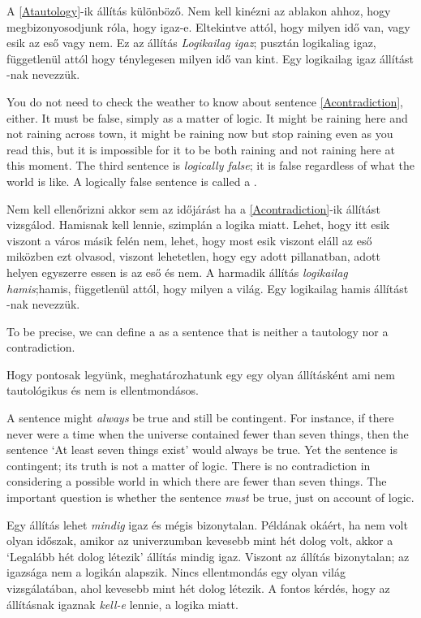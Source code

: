 A \ref{Atautology}-ik állítás különböző. Nem kell kinézni az ablakon ahhoz, hogy megbizonyosodjunk róla, hogy igaz-e. Eltekintve attól, hogy milyen idő van, vagy esik az eső vagy nem. Ez az állítás \emph{Logikailag igaz}; pusztán logikaliag igaz, függetlenül attól hogy ténylegesen milyen idő van kint. Egy logikailag igaz állítást -nak nevezzük.

You do not need to check the weather to know about sentence \ref{Acontradiction}, either. It must be false, simply as a matter of logic. It might be raining here and not raining across town, it might be raining now but stop raining even as you read this, but it is impossible for it to be both raining and not raining here at this moment. The third sentence is \emph{logically false}; it is false regardless of what the world is like. A logically false sentence is called a .

Nem kell ellenőrizni akkor sem az időjárást ha a \ref{Acontradiction}-ik állítást vizsgálod. Hamisnak kell lennie, szimplán a logika miatt. Lehet, hogy itt esik viszont a város másik felén nem, lehet, hogy most esik viszont eláll az eső miközben ezt olvasod, viszont lehetetlen, hogy egy adott pillanatban, adott helyen egyszerre essen is az eső és nem. A harmadik állítás \emph{logikailag hamis};hamis, függetlenül attól, hogy milyen a világ. Egy logikailag hamis állítást -nak nevezzük.

To be precise, we can define a  as a sentence that is neither a tautology nor a contradiction.

Hogy pontosak legyünk, meghatározhatunk egy  egy olyan állításként ami nem tautológikus és nem is ellentmondásos.

A sentence might \emph{always} be true and still be contingent. For instance, if there never were a time when the universe contained fewer than seven things, then the sentence `At least seven things exist' would always be true. Yet the sentence is contingent; its truth is not a matter of logic. There is no contradiction in considering a possible world in which there are fewer than seven things. The important question is whether the sentence \emph{must} be true, just on account of logic.

Egy állítás lehet \emph{mindig} igaz és mégis bizonytalan. Példának okáért, ha nem volt olyan időszak, amikor az univerzumban kevesebb mint hét dolog volt, akkor a `Legalább hét dolog létezik' állítás mindig igaz. Viszont az állítás bizonytalan; az igazsága nem a logikán alapszik. Nincs ellentmondás egy olyan világ vizsgálatában, ahol kevesebb mint hét dolog létezik. A fontos kérdés, hogy az állításnak igaznak \emph{kell-e} lennie, a logika miatt.


